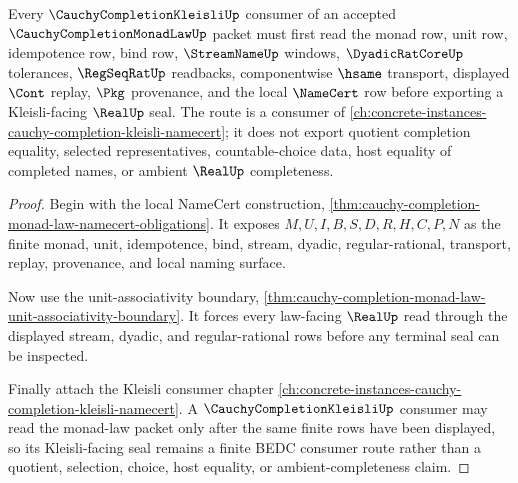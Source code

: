 \begin{theorem}
\label{thm:cauchy-completion-monad-law-kleisli-consumer-route}
Every $\CauchyCompletionKleisliUp$ consumer of an accepted
$\CauchyCompletionMonadLawUp$ packet must first read the monad row, unit row,
idempotence row, bind row, $\StreamNameUp$ windows, $\DyadicRatCoreUp$
tolerances, $\RegSeqRatUp$ readbacks, componentwise $\hsame$ transport,
displayed $\Cont$ replay, $\Pkg$ provenance, and the local $\NameCert$ row
before exporting a Kleisli-facing $\RealUp$ seal. The route is a consumer of
\autoref{ch:concrete-instances-cauchy-completion-kleisli-namecert}; it does not
export quotient completion equality, selected representatives, countable-choice
data, host equality of completed names, or ambient $\RealUp$ completeness.
\end{theorem}
\begin{proof}
Begin with the local NameCert construction,
\autoref{thm:cauchy-completion-monad-law-namecert-obligations}. It exposes
$M,U,I,B,S,D,R,H,C,P,N$ as the finite monad, unit, idempotence, bind, stream,
dyadic, regular-rational, transport, replay, provenance, and local naming
surface.

Now use the unit-associativity boundary,
\autoref{thm:cauchy-completion-monad-law-unit-associativity-boundary}. It forces
every law-facing $\RealUp$ read through the displayed stream, dyadic, and
regular-rational rows before any terminal seal can be inspected.

Finally attach the Kleisli consumer chapter
\autoref{ch:concrete-instances-cauchy-completion-kleisli-namecert}. A
$\CauchyCompletionKleisliUp$ consumer may read the monad-law packet only after
the same finite rows have been displayed, so its Kleisli-facing seal remains a
finite BEDC consumer route rather than a quotient, selection, choice, host
equality, or ambient-completeness claim.
\end{proof}
